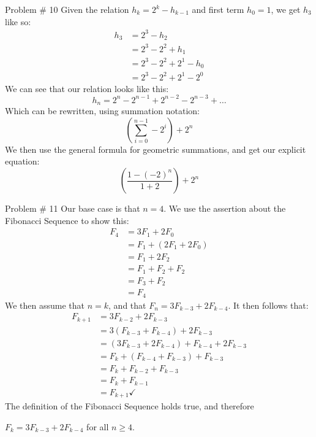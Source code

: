 \documentclass[12pt]{article}
\begin{document}
    \begin{problem}{Problem \# 10}
        Given the relation $h_k = 2^k-h_{k-1}$ and first term $h_0 = 1$, we get $h_3$ like so:
        \begin{equation*}
            \begin{split}
                h_3 & = 2^3 - h_2 \\
                & = 2^3 - 2^2 + h_1 \\
                & = 2^3 - 2^2 + 2^1 - h_0 \\
                & = 2^3 - 2^2 + 2^1 - 2^0
            \end{split}
        \end{equation*}
        We can see that our relation looks like this:
        \[h_n = 2^n - 2^{n-1} + 2^{n-2} - 2^{n-3} + \ldots\]
        Which can be rewritten, using summation notation:
        \[(\sum_{i=0}^{n-1}-2^i)+2^n\]
        We then use the general formula for geometric summations, and get our explicit equation:
        \[(\frac{1-(-2)^n}{1+2}) + 2^n\]
    \end{problem}

    \begin{problem}{Problem \# 11}
        Our base case is that $n = 4$. We use the assertion about the Fibonacci Sequence to show this:
        \begin{equation*}
            \begin{split}
                F_4 & = 3F_1 + 2F_0 \\
                & = F_1 + (2F_1 + 2F_0) \\
                & = F_1 + 2F_2 \\
                & = F_1 + F_2 + F_2 \\
                & = F_3 + F_2 \\
                & = F_4
            \end{split}
        \end{equation*}
        We then assume that $n = k$, and that $F_n = 3F_{k-3} + 2F_{k-4}$. It then follows that:
        \begin{equation*}
            \begin{split}
                F_{k+1} & = 3F_{k-2} + 2F_{k-3} \\
                & = 3(F_{k-3} + F_{k-4}) + 2F_{k-3} \\
                & = (3F_{k-3} + 2F_{k-4}) + F_{k-4} + 2F_{k-3} \\
                & = F_k + (F_{k-4} + F_{k-3}) + F_{k-3} \\
                & = F_k + F_{k-2} + F_{k-3} \\
                & = F_k + F_{k-1} \\
                & = F_{k+1} \checkmark
            \end{split}
        \end{equation*}
        The definition of the Fibonacci Sequence holds true, and therefore
        
        $F_{k} = 3F_{k-3} + 2F_{k-4}$ for all $n \geq 4$.
    \end{problem}
    
\end{document}
